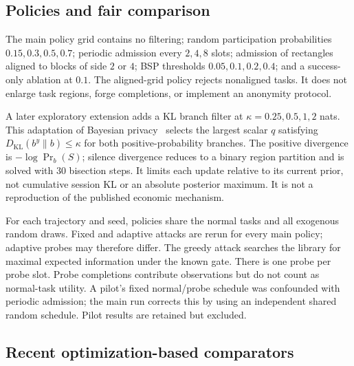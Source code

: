 \documentclass[3p,times]{elsarticle}
\begin{document}
\subsection{Policies and fair comparison}
The main policy grid contains no filtering; random participation probabilities $0.15,0.3,0.5,0.7$; periodic admission every $2,4,8$ slots; admission of rectangles aligned to blocks of side $2$ or $4$; BSP thresholds $0.05,0.1,0.2,0.4$; and a success-only ablation at $0.1$. The aligned-grid policy rejects nonaligned tasks. It does not enlarge task regions, forge completions, or implement an anonymity protocol.

A later exploratory extension adds a KL branch filter at $\kappa=0.25,0.5,1,2$ nats. This adaptation of Bayesian privacy~\cite{bayesian} selects the largest scalar $q$ satisfying $D_{\mathrm{KL}}(b^y\|b)\le\kappa$ for both positive-probability branches. The positive divergence is $-\log\Pr_b(S)$; silence divergence reduces to a binary region partition and is solved with 30 bisection steps. It limits each update relative to its current prior, not cumulative session KL or an absolute posterior maximum. It is not a reproduction of the published economic mechanism.

For each trajectory and seed, policies share the normal tasks and all exogenous random draws. Fixed and adaptive attacks are rerun for every main policy; adaptive probes may therefore differ. The greedy attack searches the library for maximal expected information under the known gate. There is one probe per probe slot. Probe completions contribute observations but do not count as normal-task utility. A pilot's fixed normal/probe schedule was confounded with periodic admission; the main run corrects this by using an independent shared random schedule. Pilot results are retained but excluded.

\subsection{Recent optimization-based comparators}
\label{sec:recentmethods}
\end{document}
